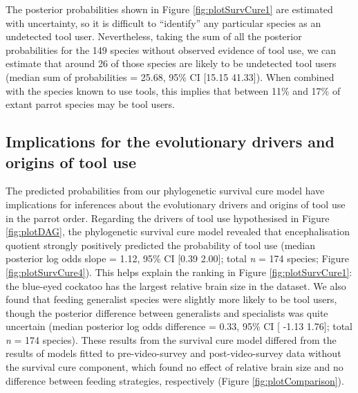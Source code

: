 \documentclass[
  man, donotrepeattitle,floatsintext]{apa6}
\begin{document}
The posterior probabilities shown in Figure \ref{fig:plotSurvCure1} are
estimated with uncertainty, so it is difficult to ``identify'' any particular
species as an undetected tool user. Nevertheless, taking the sum of all the
posterior probabilities for the
149 species without
observed evidence of tool use, we can estimate that around
26 of those species are likely to be
undetected tool users (median sum of probabilities =
25.68, 95\% CI
{[}15.15
41.33{]}). When combined with the
species known to use tools, this implies that between 11\% and 17\% of extant
parrot species may be tool users.

\hypertarget{implications-for-the-evolutionary-drivers-and-origins-of-tool-use}{%
\subsection{Implications for the evolutionary drivers and origins of tool use}\label{implications-for-the-evolutionary-drivers-and-origins-of-tool-use}}

The predicted probabilities from our phylogenetic survival cure model have
implications for inferences about the evolutionary drivers and origins of tool
use in the parrot order. Regarding the drivers of tool use hypothesised in
Figure \ref{fig:plotDAG}, the phylogenetic survival cure model revealed that
encephalisation quotient strongly positively predicted the probability of tool
use (median posterior log odds slope = 1.12, 95\%
CI {[}0.39
2.00{]}; total \emph{n} = 174
species; Figure \ref{fig:plotSurvCure4}). This helps explain the ranking in
Figure \ref{fig:plotSurvCure1}: the blue-eyed cockatoo has the largest relative
brain size in the dataset. We also found that feeding generalist species were
slightly more likely to be tool users, though the posterior difference between
generalists and specialists was quite uncertain (median posterior log odds
difference = 0.33, 95\% CI {[}
-1.13 1.76{]}; total
\emph{n} = 174 species). These results from the survival cure model
differed from the results of models fitted to pre-video-survey and
post-video-survey data without the survival cure component, which found no
effect of relative brain size and no difference between feeding strategies,
respectively (Figure \ref{fig:plotComparison}).
\end{document}
